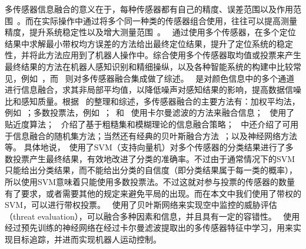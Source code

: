 多传感器信息融合的意义在于，每种传感器都有自己的精度、误差范围以及作用范围~。而在实际操作中通过将多个同一种类的传感器组合使用，往往可以提高测量精度，提升系统稳定性以及增大测量范围~。~ 通过使用多个传感器，在多个定位结果中求解最小带权均方误差的方法给出最终定位结果，提升了定位系统的稳定性，并将此方法应用到了机器人操作中。综合使用多个传感器取均值或投票来产生最终结果的方法在机器人感知识别和精细操纵，以及各种智能系统的构建中比较常见，例如~，而~ 则对多传感器融合集成做了综述。~ 是对颜色信息中的多个通道进行信息融合，求其非局部平均值，以降低噪声对感知结果的影响，提高数据信噪比和感知质量。根据~ 的整理和综述，多传感器融合的主要方法有：加权平均法，例如~；多数投票法，例如~；~和~ 使用卡尔曼滤波的方法来融合信息；~ 使用了贴近度算法；~ 介绍了基于粗糙集和模糊理论的信息融合策略；~ 中还介绍了可用于信息融合的随机集方法；当然还有经典的贝叶斯融合方法~；以及神经网络方法~ 等。
具体地说，~使用了SVM（支持向量机）对多个传感器的分类结果进行了多数投票产生最终结果，有效地改进了分类的准确率。不过由于通常情况下的SVM只能给出分类结果，而不能给出分类的自信度（即分类结果属于每一类的概率），所以使用SVM意味着只能使用多数投票法。不过这就对参与投票的传感器的数量有了要求，或者需要其他的规定来避免平局的出现。而在本文中我们使用了带权的SVM，可以进行带权投票。~ 使用了贝叶斯网络来实现空中监控的威胁评估（threat evaluation），可以融合多种因素和信息，并且具有一定的容错性。~ 使用经过预先训练的神经网络在经过卡尔曼滤波提取出的多传感器特征中学习，用来实现目标追踪，并进而实现机器人运动控制。

